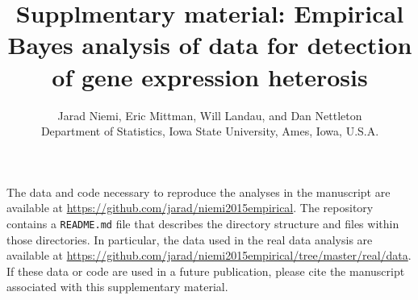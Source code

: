 \documentclass[10pt]{article}
\title{Supplmentary material: Empirical Bayes analysis of \RNAseq{} data for detection of gene expression heterosis}
\author{Jarad Niemi, 
Eric Mittman, 
Will Landau, and 
Dan Nettleton \\
Department of Statistics, Iowa State University, Ames, Iowa, U.S.A.}
\begin{document}
\maketitle

The data and code necessary to reproduce the analyses in the manuscript are available at \url{https://github.com/jarad/niemi2015empirical}. 
The repository contains a {\tt README.md} file that describes the directory structure and files within those directories.
In particular, the data used in the real data analysis are available at \url{https://github.com/jarad/niemi2015empirical/tree/master/real/data}. 
If these data or code are used in a future publication, please cite the manuscript associated with this supplementary material.
\end{document}
